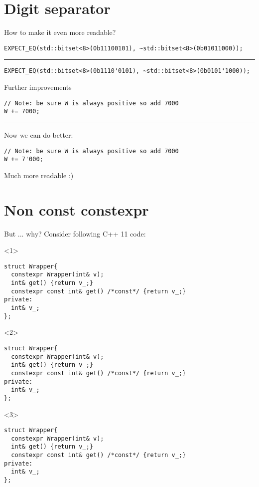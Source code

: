 \documentclass[10pt]{beamer}
\begin{document}
\section{Digit separator}
\begin{frame}[fragile]{How to make it even more readable?}
\vfill
\begin{verbatim}
EXPECT_EQ(std::bitset<8>(0b11100101), ~std::bitset<8>(0b01011000));
\end{verbatim}
\vfill
\pause
\hrule
\vfill
\begin{verbatim}
EXPECT_EQ(std::bitset<8>(0b1110'0101), ~std::bitset<8>(0b0101'1000));
\end{verbatim}
\vfill
\end{frame}

\begin{frame}[fragile]{Further improvements}
	\begin{verbatim}
// Note: be sure W is always positive so add 7000
W += 7000;
	\end{verbatim}

	\pause 
	\hrule
	Now we can do better:

	\begin{verbatim}
// Note: be sure W is always positive so add 7000
W += 7'000;	
	\end{verbatim}

	Much more readable :)

\end{frame}

\section{Non const constexpr}
\begin{frame}[fragile]{But ... why?}
	\centering Consider following C++ 11 code:

	\begin{onlyenv}
	\begin{verbatim}
struct Wrapper{
  constexpr Wrapper(int& v);
  int& get() {return v_;}
  constexpr const int& get() /*const*/ {return v_;} 
private:
  int& v_;
};
	\end{verbatim}
	\end{onlyenv}

	\begin{onlyenv}
	\begin{verbatim}
struct Wrapper{
  constexpr Wrapper(int& v);
  int& get() {return v_;}
  constexpr const int& get() /*const*/ {return v_;} 
private:
  int& v_;
};
	\end{verbatim}
	\end{onlyenv}

	\begin{onlyenv}
	\begin{verbatim}
struct Wrapper{
  constexpr Wrapper(int& v);
  int& get() {return v_;}
  constexpr const int& get() /*const*/ {return v_;} 
private:
  int& v_;
};
	\end{verbatim}
	\end{onlyenv}
\end{frame}
\end{document}
